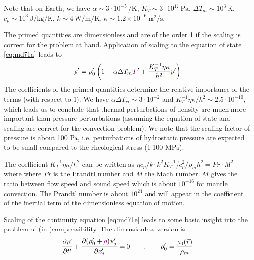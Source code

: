 Note that on Earth, we have
$\alpha \sim 3\cdot 10^{-5}~\si{\per\kelvin}$,
$K_T \sim 3\cdot 10^{12}~\si{\pascal}$,
$\Delta T_m \sim 10^3~\si{\kelvin}$,
$c_p \sim 10^3~\si{\joule\per\kg\per\kelvin}$,
$k\sim 4~\si{\watt\per\meter\per\kelvin}$,
$\kappa \sim 1.2\times 10^{-6}~\si{\square\meter\per\second}$.

The primed quantities are dimensionless and are of the order 1 if the scaling is correct for
the problem at hand.
Application of scaling to the equation of state \eqref{eq:md71a} leads to
\begin{equation}
\rho' = \rho_0' \left(  1 - \alpha \Delta T_m {\color{violet} T}' + 
\frac{K_T^{-1}\eta \kappa }{h^2} {\color{violet} p}' \right)
\label{eq:md72}
\end{equation}
The coefficients of the primed-quantities determine the relative importance of the terms
(with respect to 1). We have 
$\alpha \Delta T_m \sim 3\cdot 10^{-2}$ and $K_T^{-1}\eta \kappa/h^2 \sim 2.5\cdot 10^{-10}$,
which leads us to conclude that
thermal perturbations of density are much more important than pressure perturbations
(assuming the equation of state and scaling are correct for the convection problem). We
note that the scaling factor of pressure is about 100 Pa, i.e. perturbations of hydrostatic
pressure are expected to be small compared to the rheological stress (1-100 MPa).

The coefficient $K_T^{-1}\eta \kappa/h^2$ can be written as 
$\eta c_p/k \cdot k^2 K_T^{-1}/c_p^2/\rho_m h^2 = Pr \cdot M^2$
where where $Pr$ is the
Prandtl number and $M$ the Mach number. $M$ gives the ratio between flow speed and
sound speed which is about $10^{-16}$ for mantle convection. The Prandtl number is about $10^{24}$
and will appear in the coefficient of the inertial term of the dimensionless equation of
motion.

Scaling of the continuity equation \eqref{eq:md71e} leads to some basic insight into the problem of
(in-)compressibility. The dimensionless version is
\begin{equation}
\frac{\partial {\color{violet}\rho}'}{\partial t'} + 
\frac{\partial (\rho_0' + {\color{violet}\rho})\upnu_j'  }{\partial x_j'} = 0
\qquad
; \qquad
\rho_0' = \frac{\rho_0(\vec{r})}{\rho_m}
\label{eq:md73a}
\end{equation}


